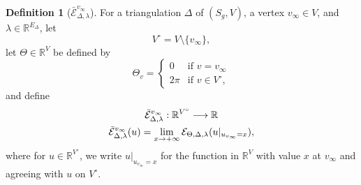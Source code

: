 \documentclass[a4paper, 11pt]{article}
\newcommand{\R}{\mathbb{R}}
\newcommand{\Ecal}{\mathcal{E}}
\newcommand{\Ecalbar}{\bar{\Ecal}}
\newcommand{\Vo}{V^{\circ}}
\theoremstyle{plain}
\theoremstyle{definition}
\newtheorem{definition}[theorem]{Definition}
\begin{document}
\begin{definition}[$\Ecalbar^{v_{\infty}}_{\Delta,\lambda}$]
  \label{def:Ecalbar}
  For a triangulation $\Delta$ of $(S_{g},V)$, a vertex
  $v_{\infty}\in V$, and $\lambda\in\R^{E_{\Delta}}$, let
  \begin{equation}
    \label{eq:Vo}
    \Vo=V\setminus\{v_{\infty}\}, 
  \end{equation}
  let $\Theta\in\R^{V}$ be defined by
  \begin{equation}
    \label{eq:ThetaEcalbar}
    \Theta_{v}=
    \begin{cases}
      0 & \text{if }v=v_{\infty}\\
      2\pi & \text{if } v\in \Vo, 
    \end{cases}
  \end{equation}
  and define
  \begin{gather}
    \notag
    \Ecalbar^{v_{\infty}}_{\Delta,\lambda}:
    \R^{\Vo}\longrightarrow\R\\
    \label{eq:Ecalbarlim}
    \Ecalbar^{v_{\infty}}_{\Delta,\lambda}(u)
    =\lim_{x\rightarrow+\infty}
    \Ecal_{\Theta,\Delta,\lambda}(u|_{u_{v_{\infty}}=x}),
  \end{gather}
  where for $u\in\R^{\Vo}$, we write $u|_{u_{v_{\infty}}=x}$ for the
  function in $\R^{V}$ with value $x$ at $v_{\infty}$ and agreeing
  with $u$ on $\Vo$.

\end{definition}
\end{document}
